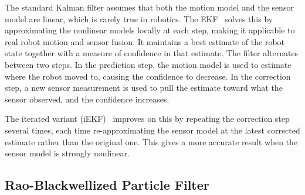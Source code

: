 %
The standard Kalman filter assumes that both the motion model and the sensor
model are linear, which is rarely true in robotics.
The EKF~\cite[pp.~48 to~65]{thrun2005probabilistic} solves this by
approximating the nonlinear models locally at each step, making it applicable
to real robot motion and sensor fusion.
It maintains a best estimate of the robot state together with a measure of
confidence in that estimate.
The filter alternates between two steps.
In the prediction step, the motion model is used to estimate where the robot
moved to, causing the confidence to decrease.
In the correction step, a new sensor measurement is used to pull the estimate
toward what the sensor observed, and the confidence increases.

The iterated variant (iEKF)~\cite{bell1993iterated} improves on this by
repeating the correction step several times, each time re-approximating the
sensor model at the latest corrected estimate rather than the original one.
This gives a more accurate result when the sensor model is strongly nonlinear.

\subsection{Rao-Blackwellized Particle Filter}


